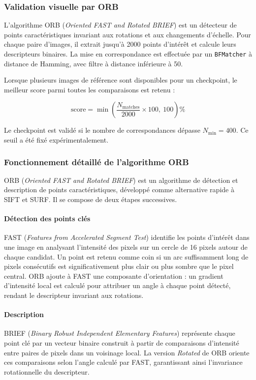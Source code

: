 \subsubsection{Validation visuelle par ORB}

L'algorithme ORB (\textit{Oriented FAST and Rotated BRIEF}) est un
détecteur de points caractéristiques invariant aux rotations et aux
changements d'échelle. Pour chaque paire d'images, il extrait jusqu'à
2000 points d'intérêt et calcule leurs descripteurs binaires. La mise
en correspondance est effectuée par un \texttt{BFMatcher} à distance de
Hamming, avec filtre à distance inférieure à 50.

Lorsque plusieurs images de référence sont disponibles pour un checkpoint,
le meilleur score parmi toutes les comparaisons est retenu :

\begin{equation}
    \text{score} = \min\left(\frac{N_{\text{matches}}}{2000} \times 100,\ 100\right) \%
\end{equation}

Le checkpoint est validé si le nombre de correspondances dépasse
$N_{\text{min}} = 400$. Ce seuil a été fixé expérimentalement.


\subsubsection{Fonctionnement détaillé de l'algorithme ORB}

ORB (\textit{Oriented FAST and Rotated BRIEF}) est un algorithme de
détection et description de points caractéristiques, développé comme
alternative rapide à SIFT et SURF. Il se compose de deux étapes
successives.

\paragraph{Détection des points clés}
FAST (\textit{Features from Accelerated Segment Test}) identifie les
points d'intérêt dans une image en analysant l'intensité des pixels
sur un cercle de 16 pixels autour de chaque candidat. Un point est
retenu comme coin si un arc suffisamment long de pixels consécutifs
est significativement plus clair ou plus sombre que le pixel central.
ORB ajoute à FAST une composante d'orientation : un gradient d'intensité
local est calculé pour attribuer un angle à chaque point détecté, rendant
le descripteur invariant aux rotations.

\paragraph{Description}
BRIEF (\textit{Binary Robust Independent Elementary Features}) représente
chaque point clé par un vecteur binaire construit à partir de comparaisons
d'intensité entre paires de pixels dans un voisinage local. La version
\textit{Rotated} de ORB oriente ces comparaisons selon l'angle calculé
par FAST, garantissant ainsi l'invariance rotationnelle du descripteur.

